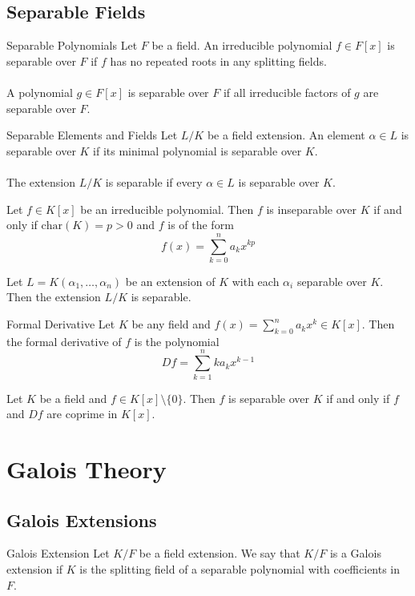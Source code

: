 \documentclass[a4paper]{article}
\begin{document}
\subsection{Separable Fields}
\begin{defn}{Separable Polynomials}{} Let $F$ be a field. An irreducible polynomial $f\in F[x]$ is separable over $F$ if $f$ has no repeated roots in any splitting fields. \\~\\
A polynomial $g\in F[x]$ is separable over $F$ if all irreducible factors of $g$ are separable over $F$. 
\end{defn}

\begin{defn}{Separable Elements and Fields}{} Let $L/K$ be a field extension. An element $\alpha\in L$ is separable over $K$ if its minimal polynomial is separable over $K$. \\~\\
The extension $L/K$ is separable if every $\alpha\in L$ is separable over $K$. 
\end{defn}

\begin{thm}{}{} Let $f\in K[x]$ be an irreducible polynomial. Then $f$ is inseparable over $K$ if and only if $\text{char}(K)=p>0$ and $f$ is of the form $$f(x)=\sum_{k=0}^na_kx^{kp}$$
\end{thm}

\begin{thm}{}{} Let $L=K(\alpha_1,\dots,\alpha_n)$ be an extension of $K$ with each $\alpha_i$ separable over $K$. Then the extension $L/K$ is separable. 
\end{thm}

\begin{defn}{Formal Derivative}{} Let $K$ be any field and $f(x)=\sum_{k=0}^na_kx^k\in K[x]$. Then the formal derivative of $f$ is the polynomial $$Df=\sum_{k=1}^{n}ka_kx^{k-1}$$
\end{defn}

\begin{lmm}{}{} Let $K$ be a field and $f\in K[x]\setminus\{0\}$. Then $f$ is separable over $K$ if and only if $f$ and $Df$ are coprime in $K[x]$. 
\end{lmm}

\pagebreak
\section{Galois Theory}
\subsection{Galois Extensions}
\begin{defn}{Galois Extension}{} Let $K/F$ be a field extension. We say that $K/F$ is a Galois extension if $K$ is the splitting field of a separable polynomial with coefficients in $F$. 
\end{defn}
\end{document}
